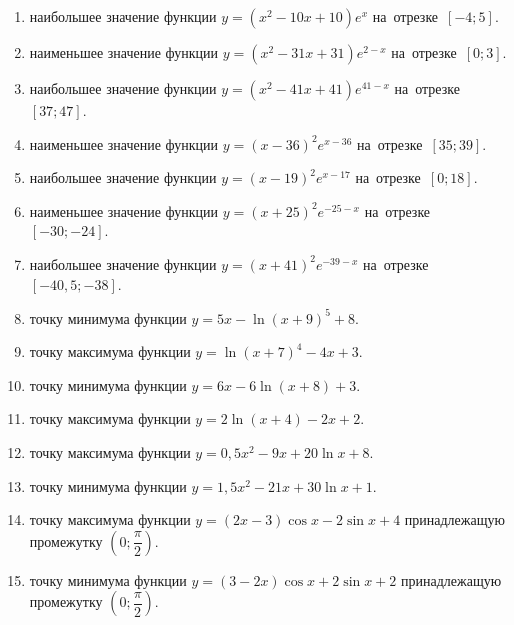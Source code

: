 \documentclass[a4paper,10pt]{article}
\begin{document}
\begin{enumerate}
\item {} наибольшее значение функции $y=\left(x^2 -10x +10\right)e^{x}$ на~отрезке~$\left[-4;5\right]$.

\item {} наименьшее значение функции $y=\left(x^2 -31x +31\right)e^{2-x}$ на~отрезке~$\left[0;3\right]$.

\item {} наибольшее значение функции $y=\left(x^2 -41x +41\right)e^{41-x}$ на~отрезке~$\left[37;47\right]$.

\item {} наименьшее значение функции $y=\left(x-36\right)^2e^{x-36}$ на~отрезке~$\left[35;39\right]$.

\item {} наибольшее значение функции $y=\left(x-19\right)^2e^{x-17}$ на~отрезке~$\left[0;18\right]$.

\item {} наименьшее значение функции $y=\left(x+25\right)^2e^{-25-x}$ на~отрезке~$\left[-30;-24\right]$.

\item {} наибольшее значение функции $y=\left(x+41\right)^2e^{-39-x}$ на~отрезке~$\left[-40,5;-38\right]$.

\item {} точку минимума функции $y=5x-\ln\left(x+9\right)^{5}+8$.

\item {} точку максимума функции $y=\ln\left(x+7\right)^{4}-4x+3$.

\item {} точку минимума функции $y=6x-6\ln\left(x+8\right)+3$.

\item {} точку максимума функции $y=2\ln\left(x+4\right)-2x+2$.

\item {} точку максимума функции $y=0,5x^2-9x+20\ln x +8$.

\item {} точку минимума функции $y=1,5x^2-21x+30\ln x +1$.

\item {} точку максимума функции $y=\left(2x-3\right)\cos x -2\sin x+4$
принадлежащую промежутку $\left(0;\dfrac{\pi}{2}\right)$.

\item {} точку минимума функции $y=\left(3-2x\right)\cos x +2\sin x+2$
принадлежащую промежутку $\left(0;\dfrac{\pi}{2}\right)$.


\end{enumerate}
\end{document}
